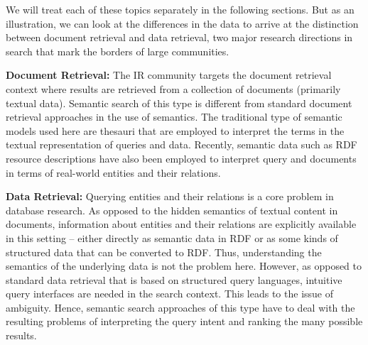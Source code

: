 We will treat each of these topics separately in the following sections. But as an illustration, we can look at the differences in the data to arrive at the distinction between document retrieval and data retrieval, two major research directions in search that mark the borders of large communities. 

\textbf{Document Retrieval:} The IR community targets the document retrieval context where results are retrieved from a collection of documents (primarily textual data). Semantic search of this type is different from standard document retrieval approaches in the use of semantics. The traditional type of semantic models used here are thesauri that are employed to interpret the terms in the textual representation of queries and data. Recently, semantic data such as RDF resource descriptions have also been employed to interpret query and documents in terms of real-world entities and their relations. 

\textbf{Data Retrieval:} Querying entities and their relations is a core problem in database research. As opposed to the hidden semantics of textual content in documents, information about entities and their relations are explicitly available in this setting -- either directly as semantic data in RDF or as some kinds of structured data that can be converted to RDF. Thus, understanding the semantics of the underlying data is not the problem here. However, as opposed to standard data retrieval that is based on structured query languages, intuitive query interfaces are needed in the search context. This leads to the issue of ambiguity. Hence, semantic search approaches of this type have to deal with the resulting problems of interpreting the query intent and ranking the many possible results. 


